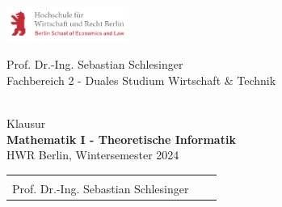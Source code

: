\thispagestyle{scrplain}
\vspace*{-3cm}
\begin{minipage}[t][1.1cm][c]{4.5cm}
  \includegraphics[width=4cm]{include/hwr-logo.png}
\end{minipage}
\hfill
\begin{minipage}[t][1.5cm][c]{8cm}
  \begin{center}
  \begin{footnotesize}
    \textsf{Prof. Dr.-Ing. Sebastian Schlesinger} \\[-0.1cm]
    \textsf{Fachbereich 2 - Duales Studium Wirtschaft \& Technik}
  \end{footnotesize}
  \end{center}
\end{minipage}
\hfill

\vspace*{-0.3cm}
\begin{center} 
  \hrulefill \\[0.1cm]
  {\large Klausur} \\[0.15cm]
  {\huge \bfseries Mathematik I - Theoretische Informatik} \\[0.10cm]
  {HWR Berlin, Wintersemester 2024} \\[-0.4cm]
  \begin{tabular}{lcr}
    \hspace{0.3\textwidth}   & \hspace{0.3\textwidth} & \hspace{0.3\textwidth} \\
    Prof. Dr.-Ing. Sebastian Schlesinger   %
  \end{tabular} \\[0.1cm]
  \hrulefill
\end{center}